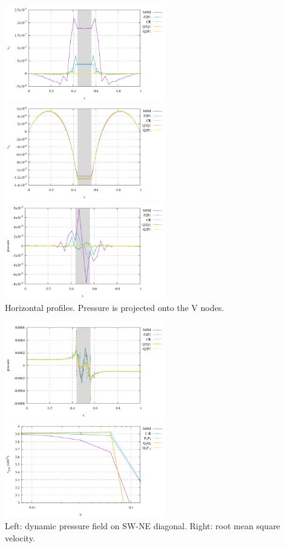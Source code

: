 \begin{center}
\includegraphics[width=7cm]{python_codes/fieldstone_112/results/exp2/hprofile_u.pdf}
\includegraphics[width=7cm]{python_codes/fieldstone_112/results/exp2/hprofile_v.pdf}
\includegraphics[width=7cm]{python_codes/fieldstone_112/results/exp2/hprofile_p.pdf}\\
{\captionfont Horizontal profiles. Pressure is projected onto the V nodes.}
\end{center}

\begin{center}
\includegraphics[width=7cm]{python_codes/fieldstone_112/results/exp2/diag_profile_p.pdf}
\includegraphics[width=7cm]{python_codes/fieldstone_112/results/exp2/vrms.pdf}\\
{\captionfont Left: dynamic pressure field on SW-NE diagonal. Right: root mean square velocity.}
\end{center}










